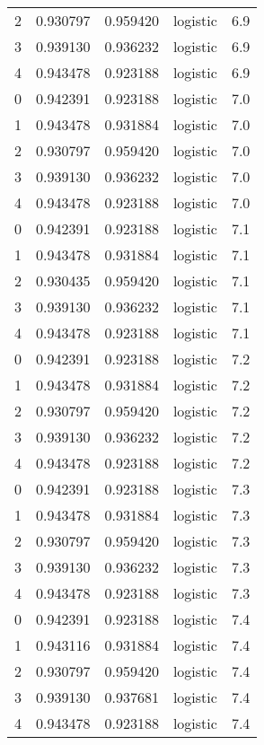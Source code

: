 \begin{tabular}{rrrlr}
     2 & 0.930797 & 0.959420 & logistic &        6.9 \\
     3 & 0.939130 & 0.936232 & logistic &        6.9 \\
     4 & 0.943478 & 0.923188 & logistic &        6.9 \\
     0 & 0.942391 & 0.923188 & logistic &        7.0 \\
     1 & 0.943478 & 0.931884 & logistic &        7.0 \\
     2 & 0.930797 & 0.959420 & logistic &        7.0 \\
     3 & 0.939130 & 0.936232 & logistic &        7.0 \\
     4 & 0.943478 & 0.923188 & logistic &        7.0 \\
     0 & 0.942391 & 0.923188 & logistic &        7.1 \\
     1 & 0.943478 & 0.931884 & logistic &        7.1 \\
     2 & 0.930435 & 0.959420 & logistic &        7.1 \\
     3 & 0.939130 & 0.936232 & logistic &        7.1 \\
     4 & 0.943478 & 0.923188 & logistic &        7.1 \\
     0 & 0.942391 & 0.923188 & logistic &        7.2 \\
     1 & 0.943478 & 0.931884 & logistic &        7.2 \\
     2 & 0.930797 & 0.959420 & logistic &        7.2 \\
     3 & 0.939130 & 0.936232 & logistic &        7.2 \\
     4 & 0.943478 & 0.923188 & logistic &        7.2 \\
     0 & 0.942391 & 0.923188 & logistic &        7.3 \\
     1 & 0.943478 & 0.931884 & logistic &        7.3 \\
     2 & 0.930797 & 0.959420 & logistic &        7.3 \\
     3 & 0.939130 & 0.936232 & logistic &        7.3 \\
     4 & 0.943478 & 0.923188 & logistic &        7.3 \\
     0 & 0.942391 & 0.923188 & logistic &        7.4 \\
     1 & 0.943116 & 0.931884 & logistic &        7.4 \\
     2 & 0.930797 & 0.959420 & logistic &        7.4 \\
     3 & 0.939130 & 0.937681 & logistic &        7.4 \\
     4 & 0.943478 & 0.923188 & logistic &        7.4 \\

\end{tabular}

